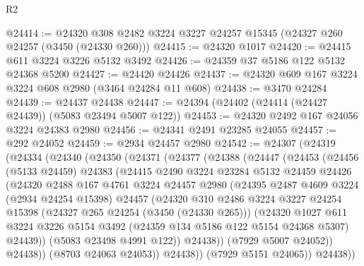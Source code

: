 \begin{lexlean}{R2}
\begin{coremodule}
@24414 := @24320 @308 @2482 @3224 @3227 @24257 @15345 (@24327 @260 @24257 (@3450 (@24330 @260)))
@24415 := @24320 @1017
@24420 := @24415 @611 @3224 @3226 @5132 @3492
@24426 := @24359 @37 @5186 @122 @5132 @24368 @5200
@24427 := @24420 @24426
@24437 := @24320 @609 @167 @3224 @3224 @608 @2980 (@3464 @24284 @11 @608)
@24438 := @3470 @24284
@24439 := @24437 @24438
@24447 := @24394 (@24402 (@24414 (@24427 @24439)) (@5083 @23494 @5007 @122))
@24453 := @24320 @2492 @167 @24056 @3224 @24383 @2980
@24456 := @24341 @2491 @23285 @24055
@24457 := @292 @24052
@24459 := @2934 @24457 @2980
@24542 := @24307
    (@24319
      (@24334
        (@24340
          (@24350
            (@24371
              (@24377
                (@24388
                  (@24447
                    (@24453
                      (@24456
                        (@5133 @24459)
                        @24383
                        (@24415
                          @2490
                          @3224
                          @23284
                          @5132
                          @24459
                          @24426
                          (@24320
                            @2488
                            @167
                            @4761
                            @3224
                            @24457
                            @2980
                            (@24395
                              @2487
                              @4609
                              @3224
                              (@2934 @24254 @15398)
                              @24457
                              (@24320
                                @310
                                @2486
                                @3224
                                @3227
                                @24254
                                @15398
                                (@24327 @265 @24254 (@3450 (@24330 @265)))
                                (@24320
                                  @1027
                                  @611
                                  @3224
                                  @3226
                                  @5154
                                  @3492
                                  (@24359 @134 @5186 @122 @5154 @24368 @5307)
                                  @24439))
                              (@5083 @23498 @4991 @122))
                            @24438))
                        (@7929 @5007 @24052))
                      @24438))
                  (@8703 @24063 @24053))
                @24438))
            (@7929 @5151 @24065))
          @24438))

\end{coremodule}
\end{lexlean}
